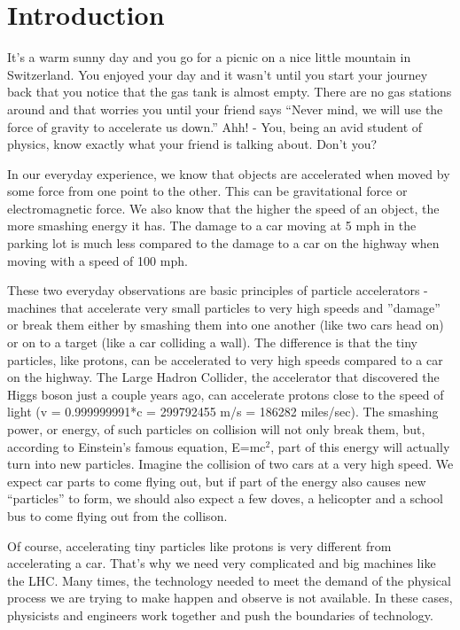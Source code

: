 \section{Introduction}

\noindent
It's a warm sunny day and you go for a picnic on a nice little mountain in Switzerland. You enjoyed your day and it wasn't until you start your journey back that you notice that the gas tank is almost empty. There are no gas stations around and that worries you until your friend says ``Never mind, we will use the force of gravity to accelerate us down.'' Ahh! - You, being an avid student of physics, know exactly what your friend is talking about. Don't you?

\;
\noindent
In our everyday experience, we know that objects are accelerated when moved by some force from one point to the other. This can be gravitational force or electromagnetic force.
We also know that the higher the speed of an object, the more smashing energy it has. The damage to a car moving at 5 mph in the parking lot is much less compared to the damage to a car on the highway when moving with a speed of 100 mph.

\;
\noindent
These two everyday observations are basic principles of particle accelerators - machines that accelerate very small particles to very high speeds and ''damage'' or break them either by smashing them into one another (like two cars head on) or on to a target (like a car colliding a wall). The difference is that the tiny particles, like protons, can be accelerated to very high speeds compared to a car on the highway. The Large Hadron Collider, the accelerator that discovered the Higgs boson just a couple years ago, can accelerate protons close to the speed of light (v = 0.999999991*c = 299792455 m/s = 186282 miles/sec). The smashing power, or energy, of such particles on collision will not only break them, but, according to Einstein's famous equation, E=mc$^{2}$, part of this energy will actually turn into new particles. Imagine the collision of two cars at a very high speed. We expect car parts to come flying out, but if part of the energy also causes new ``particles'' to form, we should also expect a few doves, a helicopter and a school bus to come flying out from the collison. 

\;
\noindent
Of course, accelerating tiny particles like protons is very different from accelerating a car. That's why we need very complicated and big machines like the LHC. Many times, the technology needed to meet the demand of the physical process we are trying to make happen and observe is not available. In these cases, physicists and engineers work together and push the boundaries of technology.

